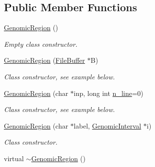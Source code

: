 \subsection*{Public Member Functions}
\begin{CompactItemize}
\item 
\hypertarget{classGenomicRegion_8ff9fe5618b932a1caccbd9072ddaaef}{
\hyperlink{classGenomicRegion_8ff9fe5618b932a1caccbd9072ddaaef}{GenomicRegion} ()}
\label{classGenomicRegion_8ff9fe5618b932a1caccbd9072ddaaef}

\begin{CompactList}\small\item\em Empty class constructor. \item\end{CompactList}\item 
\hypertarget{classGenomicRegion_c45e11c7c0d0477c4b8682ef5266d3d7}{
\hyperlink{classGenomicRegion_c45e11c7c0d0477c4b8682ef5266d3d7}{GenomicRegion} (\hyperlink{classFileBuffer}{FileBuffer} $\ast$B)}
\label{classGenomicRegion_c45e11c7c0d0477c4b8682ef5266d3d7}

\begin{CompactList}\small\item\em Class constructor, see example below. \item\end{CompactList}\item 
\hypertarget{classGenomicRegion_c22559720502ea450aeb4f65c6c789e1}{
\hyperlink{classGenomicRegion_c22559720502ea450aeb4f65c6c789e1}{GenomicRegion} (char $\ast$inp, long int \hyperlink{classGenomicRegion_efe2255aeed5338060190ded05cb9c0c}{n\_\-line}=0)}
\label{classGenomicRegion_c22559720502ea450aeb4f65c6c789e1}

\begin{CompactList}\small\item\em Class constructor, see example below. \item\end{CompactList}\item 
\hypertarget{classGenomicRegion_6de3d0ff71615c36a7311509af56ae79}{
\hyperlink{classGenomicRegion_6de3d0ff71615c36a7311509af56ae79}{GenomicRegion} (char $\ast$label, \hyperlink{classGenomicInterval}{GenomicInterval} $\ast$i)}
\label{classGenomicRegion_6de3d0ff71615c36a7311509af56ae79}

\begin{CompactList}\small\item\em Class constructor. \item\end{CompactList}\item 
\hypertarget{classGenomicRegion_37af413ecbed6ee0d36ecbc40d957947}{
virtual \hyperlink{classGenomicRegion_37af413ecbed6ee0d36ecbc40d957947}{$\sim$GenomicRegion} ()}
\label{classGenomicRegion_37af413ecbed6ee0d36ecbc40d957947}


\end{CompactItemize}

